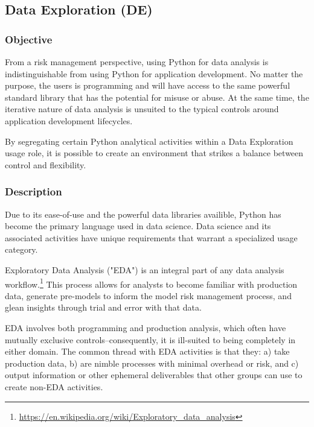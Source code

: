 
	\subsection{Data Exploration (DE)}

		\subsubsection{Objective}

			From a risk management perspective, using Python for data analysis is indistinguishable from using Python for application development. No matter the purpose, the users is programming and will have access to the same powerful standard library that has the potential for misuse or abuse. At the same time, the iterative nature of data analysis is unsuited to the typical controls around application development lifecycles. 

			By segregating certain Python analytical activities within a Data Exploration usage role, it is possible to create an environment that strikes a balance between control and flexibility.

		\subsubsection{Description}

			Due to its ease-of-use and the powerful data libraries availible, Python has become the primary language used in data science. Data science and its associated activities have unique requirements that warrant a specialized usage category. 

			Exploratory Data Analysis ("EDA") is an integral part of any data analysis workflow.\footnote{\url{https://en.wikipedia.org/wiki/Exploratory_data_analysis}} This process allows for analysts to become familiar with production data, generate pre-models to inform the model risk management process, and glean insights through trial and error with that data. 

			EDA involves both programming and production analysis, which often have mutually exclusive controls--consequently, it is ill-suited to being completely in either domain. The common thread with EDA activities is that they: a) take production data, b) are nimble processes with minimal overhead or risk, and c) output information or other ephemeral deliverables that other groups can use to create non-EDA activities.

